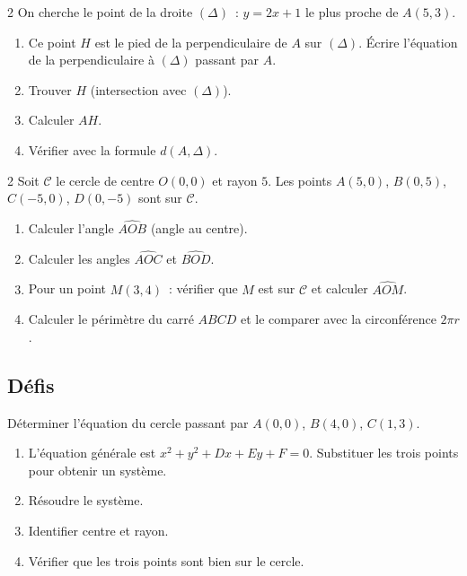 \begin{probleme}{2}
On cherche le point de la droite $(\Delta)$~: $y=2x+1$ le plus proche
de $A(5,3)$.
\begin{enumerate}
  \item Ce point $H$ est le pied de la perpendiculaire de $A$ sur $(\Delta)$.
        \'Ecrire l'\'equation de la perpendiculaire \`a $(\Delta)$ passant par $A$.
  \item Trouver $H$ (intersection avec $(\Delta)$).
  \item Calculer $AH$.
  \item V\'erifier avec la formule $d(A,\Delta)$.
\end{enumerate}
\end{probleme}

\begin{probleme}{2}
Soit $\mathcal{C}$ le cercle de centre $O(0,0)$ et rayon $5$.
Les points $A(5,0)$, $B(0,5)$, $C(-5,0)$, $D(0,-5)$ sont sur $\mathcal{C}$.
\begin{enumerate}
  \item Calculer l'angle $\widehat{AOB}$ (angle au centre).
  \item Calculer les angles $\widehat{AOC}$ et $\widehat{BOD}$.
  \item Pour un point $M(3,4)$~: v\'erifier que $M$ est sur $\mathcal{C}$
        et calculer $\widehat{AOM}$.
  \item Calculer le p\'erim\`etre du carr\'e $ABCD$ et le comparer avec
        la circonf\'erence $2\pi r$.
\end{enumerate}
\end{probleme}

\subsection*{D\'efis}

\begin{challenge}
D\'eterminer l'\'equation du cercle passant par $A(0,0)$, $B(4,0)$, $C(1,3)$.
\begin{enumerate}
  \item L'\'equation g\'en\'erale est $x^2+y^2+Dx+Ey+F=0$.
        Substituer les trois points pour obtenir un syst\`eme.
  \item R\'esoudre le syst\`eme.
  \item Identifier centre et rayon.
  \item V\'erifier que les trois points sont bien sur le cercle.
\end{enumerate}
\end{challenge}

